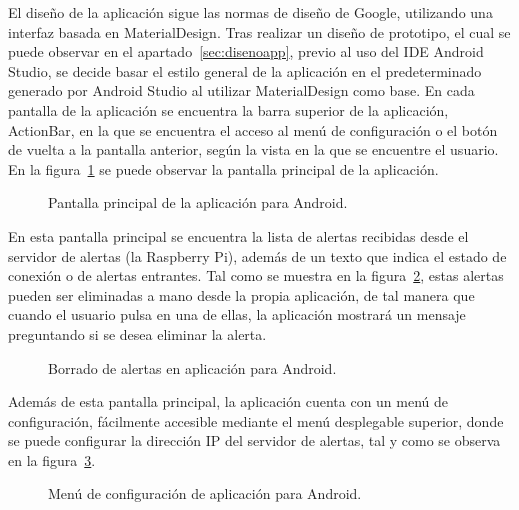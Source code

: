     El diseño de la aplicación sigue las normas de diseño de Google, utilizando una interfaz basada en MaterialDesign. Tras realizar un diseño de prototipo, el cual se puede observar en el apartado~\ref{sec:disenoapp}, previo al uso del IDE Android Studio, se decide basar el estilo general de la aplicación en el predeterminado generado por Android Studio al utilizar MaterialDesign como base. En cada pantalla de la aplicación se encuentra la barra superior de la aplicación, ActionBar, en la que se encuentra el acceso al menú de configuración o el botón de vuelta a la pantalla anterior, según la vista en la que se encuentre el usuario. En la figura~\ref{app1} se puede observar la pantalla principal de la aplicación. \\

    \begin{figure}[H]
      \centering
      {%
        \setlength{\fboxsep}{0pt}%
        \setlength{\fboxrule}{1pt}%
      }%
      \caption{Pantalla principal de la aplicación para Android.}
      \label{app1}
    \end{figure}

    En esta pantalla principal se encuentra la lista de alertas recibidas desde el servidor de alertas (la Raspberry Pi), además de un texto que indica el estado de conexión o de alertas entrantes. Tal como se muestra en la figura~\ref{app2}, estas alertas pueden ser eliminadas a mano desde la propia aplicación, de tal manera que cuando el usuario pulsa en una de ellas, la aplicación mostrará un mensaje preguntando si se desea eliminar la alerta. \\

    \begin{figure}[!ht]
      \centering
      {%
        \setlength{\fboxsep}{0pt}%
        \setlength{\fboxrule}{1pt}%
      }%
      \caption{Borrado de alertas en aplicación para Android.}
      \label{app2}
    \end{figure}

    Además de esta pantalla principal, la aplicación cuenta con un menú de configuración, fácilmente accesible mediante el menú desplegable superior, donde se puede configurar la dirección IP del servidor de alertas, tal y como se observa en la figura~\ref{app3}.

    \begin{figure}[H]
      \centering
      {%
        \setlength{\fboxsep}{0pt}%
        \setlength{\fboxrule}{1pt}%
      }%
      \caption{Menú de configuración de aplicación para Android.}
      \label{app3}
    \end{figure}

